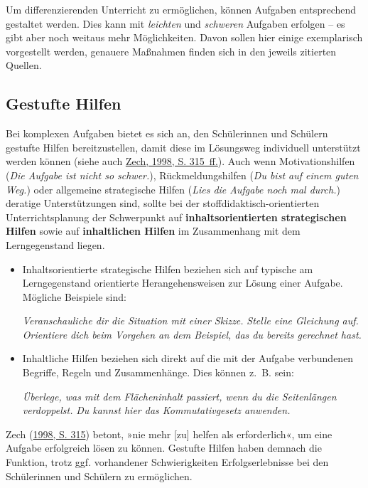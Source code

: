 \documentclass[
]{scrbook}
\theoremstyle{definition}
\theoremstyle{definition}
\theoremstyle{definition}
\theoremstyle{definition}
\theoremstyle{remark}
\begin{document}
Um differenzierenden Unterricht zu ermöglichen, können Aufgaben entsprechend gestaltet werden. Dies kann mit \emph{leichten} und \emph{schweren} Aufgaben erfolgen -- es gibt aber noch weitaus mehr Möglichkeiten. Davon sollen hier einige exemplarisch vorgestellt werden, genauere Maßnahmen finden sich in den jeweils zitierten Quellen.

\hypertarget{gestufte-hilfen}{%
\subsection{Gestufte Hilfen}\label{gestufte-hilfen}}

Bei komplexen Aufgaben bietet es sich an, den Schülerinnen und Schülern gestufte Hilfen bereitzustellen, damit diese im Lösungsweg individuell unterstützt werden können (siehe auch \protect\hyperlink{ref-Zech1998}{Zech, 1998, S. 315~ff.}). Auch wenn Motivationshilfen (\emph{Die Aufgabe ist nicht so schwer.}), Rückmeldungshilfen (\emph{Du bist auf einem guten Weg.}) oder allgemeine strategische Hilfen (\emph{Lies die Aufgabe noch mal durch.}) deratige Unterstützungen sind, sollte bei der stoffdidaktisch-orientierten Unterrichtsplanung der Schwerpunkt auf \textbf{inhaltsorientierten strategischen Hilfen} sowie auf \textbf{inhaltlichen Hilfen} im Zusammenhang mit dem Lerngegenstand liegen.

\begin{itemize}
\item
  Inhaltsorientierte strategische Hilfen beziehen sich auf typische am Lerngegenstand orientierte Herangehensweisen zur Lösung einer Aufgabe. Mögliche Beispiele sind:

  \emph{Veranschauliche dir die Situation mit einer Skizze.}
  \emph{Stelle eine Gleichung auf.}
  \emph{Orientiere dich beim Vorgehen an dem Beispiel, das du bereits gerechnet hast.}
\item
  Inhaltliche Hilfen beziehen sich direkt auf die mit der Aufgabe verbundenen Begriffe, Regeln und Zusammenhänge. Dies können z.~B. sein:

  \emph{Überlege, was mit dem Flächeninhalt passiert, wenn du die Seitenlängen verdoppelst.}
  \emph{Du kannst hier das Kommutativgesetz anwenden.}
\end{itemize}

Zech (\protect\hyperlink{ref-Zech1998}{1998, S. 315}) betont, »nie mehr {[}zu{]} helfen als erforderlich«, um eine Aufgabe erfolgreich lösen zu können. Gestufte Hilfen haben demnach die Funktion, trotz ggf. vorhandener Schwierigkeiten Erfolgserlebnisse bei den Schülerinnen und Schülern zu ermöglichen.
\end{document}
